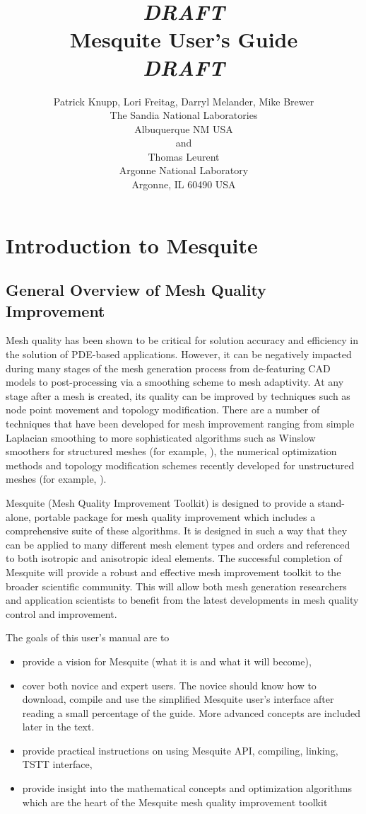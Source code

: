 \documentclass[letter]{report}
\title{ {\LARGE\bf \emph{DRAFT} \\
        Mesquite User's Guide\\
                 \emph{DRAFT} }}
\author{Patrick Knupp, Lori Freitag, Darryl Melander, Mike Brewer \\
The Sandia National Laboratories \\
Albuquerque NM USA \\
and \\
Thomas Leurent \\
Argonne National Laboratory \\
Argonne, IL 60490 USA}
\date{}
\begin{document}
\maketitle

\tableofcontents

\listoffigures

\listoftables

\chapter{Introduction to Mesquite} 

\section{General Overview of Mesh Quality Improvement}

Mesh quality has been shown to be critical for solution accuracy and
efficiency in the solution of PDE-based applications.  However, it can
be negatively impacted during many stages of the mesh generation
process from de-featuring CAD models to post-processing via a smoothing
scheme to mesh adaptivity. At any stage after a mesh is created, its
quality can be improved by techniques such as node point movement and
topology modification.  There are a number of techniques that have
been developed for mesh improvement ranging from simple Laplacian smoothing
\cite{F88} to more sophisticated algorithms such as Winslow smoothers
for structured meshes (for example, \cite{winslow}), the numerical
optimization methods and topology modification schemes recently
developed for unstructured meshes (for example, \cite{Opt-MS,Kn00,FrKn01,
FeasNewt,bjoe:swap,bjoe:chain-swap,es92}).

Mesquite (Mesh Quality Improvement Toolkit) is designed to provide a
stand-alone, portable package for mesh quality improvement which
includes a comprehensive suite of these algorithms.  It is designed in
such a way that they can be applied to many different mesh element
types and orders and referenced to both isotropic and anisotropic
ideal elements.  The successful completion of Mesquite will provide a
robust and effective mesh improvement toolkit to the broader
scientific community.  This will allow both mesh generation
researchers and application scientists to benefit from the latest
developments in mesh quality control and improvement.

The goals of this user's manual are to
\begin{itemize}
\item provide a vision for Mesquite (what it is and what it will become),
\item cover both novice and expert users. The novice should know how to
download, compile and use the simplified Mesquite user's interface
after reading a small percentage of the guide. More 
advanced concepts are included later in the text.
\item provide practical instructions on using Mesquite API, compiling,
linking, TSTT interface,
\item provide insight into the mathematical concepts and optimization 
algorithms which are the heart of the Mesquite mesh quality improvement 
toolkit
\end{itemize}
\end{document}
